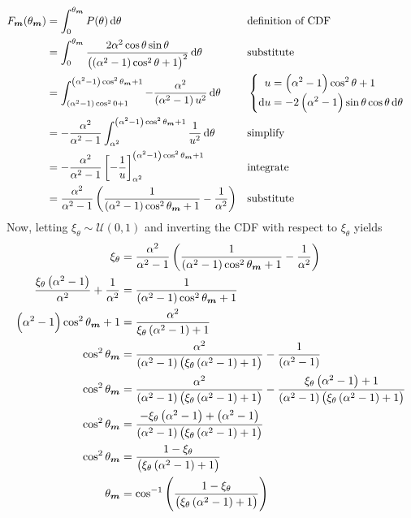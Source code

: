 \documentclass[12pt]{article}
\begin{document}
\begin{align*}
  F_{\bm m}(\theta_{\bm m})
  &= \int_0^{\theta_{\bm m}} P(\theta)\dif\theta && \text{definition of CDF}\\
  &= \int_0^{\theta_{\bm m}} \frac{2\alpha^2 \cos\theta \sin\theta}{\del{\del{\alpha^2 - 1}\cos^2 \theta + 1}^2}\dif\theta && \text{substitute}\\
  &= \int_{\del{\alpha^2 - 1}\cos^20 + 1}^{\del{\alpha^2 - 1}\cos^2\theta_{\bm m} + 1} -\frac{\alpha^2}{\del{\alpha^2 - 1} u^2}\dif\theta && \begin{cases}
    \begin{aligned}
      u &= \del{\alpha^2 - 1}\cos^2\theta + 1\\
      \dif u &= -2\del{\alpha^2 - 1}\sin \theta \cos \theta \dif \theta
    \end{aligned}
  \end{cases} \\
  &= -\frac{\alpha^2}{\alpha^2 - 1} \int_{\alpha^2}^{\del{\alpha^2 - 1}\cos^2\theta_{\bm m} + 1} \frac{1}{u^2}\dif\theta && \text{simplify}\\
  &= -\frac{\alpha^2}{\alpha^2 - 1} \left[ -\frac{1}{u} \right]_{\alpha^2}^{\del{\alpha^2 - 1}\cos^2\theta_{\bm m} + 1} && \text{integrate}\\
  &= \frac{\alpha^2}{\alpha^2 - 1}  \del{\frac{1}{\del{\alpha^2 - 1}\cos^2\theta_{\bm m} + 1} - \frac{1}{\alpha^2}}  && \text{substitute}
\end{align*}
Now, letting \(\xi_\theta \sim \mathcal{U}(0, 1)\) and inverting the CDF with respect to \(\xi_\theta\) yields
\begin{align*}
  \xi_\theta &= \frac{\alpha^2}{\alpha^2 - 1}  \del{\frac{1}{\del{\alpha^2 - 1}\cos^2\theta_{\bm m} + 1} - \frac{1}{\alpha^2}}\\
  \frac{\xi_\theta\del{\alpha^2 - 1}}{\alpha^2} + \frac{1}{\alpha^2}&= \frac{1}{\del{\alpha^2 - 1}\cos^2\theta_{\bm m} + 1}\\
  \del{\alpha^2 - 1}\cos^2\theta_{\bm m} + 1&= \frac{\alpha^2}{\xi_\theta\del{\alpha^2 - 1} + 1}\\
  \cos^2\theta_{\bm m}&= \frac{\alpha^2}{\del{\alpha^2 - 1}\del{\xi_\theta\del{\alpha^2 - 1} + 1}} - \frac{1}{\del{\alpha^2 - 1}}\\
  \cos^2\theta_{\bm m}&= \frac{\alpha^2}{\del{\alpha^2 - 1}\del{\xi_\theta\del{\alpha^2 - 1} + 1}} - \frac{\xi_\theta\del{\alpha^2 - 1} + 1}{\del{\alpha^2 - 1}\del{\xi_\theta\del{\alpha^2 - 1} + 1}}\\
  \cos^2\theta_{\bm m}&= \frac{ - \xi_\theta\del{\alpha^2 - 1} + \del{\alpha^2 - 1}}{\del{\alpha^2 - 1}\del{\xi_\theta\del{\alpha^2 - 1} + 1}}\\
  \cos^2\theta_{\bm m}&= \frac{1- \xi_\theta}{\del{\xi_\theta\del{\alpha^2 - 1} + 1}}\\
  \theta_{\bm m}&= \cos^{-1}\del{\frac{1- \xi_\theta}{\del{\xi_\theta\del{\alpha^2 - 1} + 1}}}\\
\end{align*}
\end{document}
